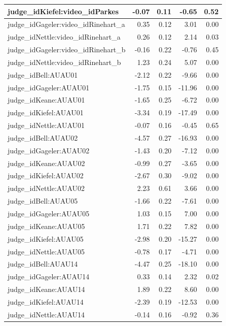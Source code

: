 \documentclass{monashthesis}
\begin{document}
\begin{tabular}{l|r|r|r|r}
\hline
judge\_idKiefel:video\_idParkes & -0.07 & 0.11 & -0.65 & 0.52\\
\hline
judge\_idGageler:video\_idRinehart\_a & 0.35 & 0.12 & 3.01 & 0.00\\
\hline
judge\_idNettle:video\_idRinehart\_a & 0.26 & 0.12 & 2.14 & 0.03\\
\hline
judge\_idGageler:video\_idRinehart\_b & -0.16 & 0.22 & -0.76 & 0.45\\
\hline
judge\_idNettle:video\_idRinehart\_b & 1.23 & 0.24 & 5.07 & 0.00\\
\hline
judge\_idBell:AUAU01 & -2.12 & 0.22 & -9.66 & 0.00\\
\hline
judge\_idGageler:AUAU01 & -1.75 & 0.15 & -11.96 & 0.00\\
\hline
judge\_idKeane:AUAU01 & -1.65 & 0.25 & -6.72 & 0.00\\
\hline
judge\_idKiefel:AUAU01 & -3.34 & 0.19 & -17.49 & 0.00\\
\hline
judge\_idNettle:AUAU01 & -0.07 & 0.16 & -0.45 & 0.65\\
\hline
judge\_idBell:AUAU02 & -4.57 & 0.27 & -16.93 & 0.00\\
\hline
judge\_idGageler:AUAU02 & -1.43 & 0.20 & -7.12 & 0.00\\
\hline
judge\_idKeane:AUAU02 & -0.99 & 0.27 & -3.65 & 0.00\\
\hline
judge\_idKiefel:AUAU02 & -2.67 & 0.30 & -9.02 & 0.00\\
\hline
judge\_idNettle:AUAU02 & 2.23 & 0.61 & 3.66 & 0.00\\
\hline
judge\_idBell:AUAU05 & -1.66 & 0.22 & -7.61 & 0.00\\
\hline
judge\_idGageler:AUAU05 & 1.03 & 0.15 & 7.00 & 0.00\\
\hline
judge\_idKeane:AUAU05 & 1.71 & 0.22 & 7.82 & 0.00\\
\hline
judge\_idKiefel:AUAU05 & -2.98 & 0.20 & -15.27 & 0.00\\
\hline
judge\_idNettle:AUAU05 & -0.78 & 0.17 & -4.71 & 0.00\\
\hline
judge\_idBell:AUAU14 & -4.47 & 0.25 & -18.10 & 0.00\\
\hline
judge\_idGageler:AUAU14 & 0.33 & 0.14 & 2.32 & 0.02\\
\hline
judge\_idKeane:AUAU14 & 1.89 & 0.22 & 8.60 & 0.00\\
\hline
judge\_idKiefel:AUAU14 & -2.39 & 0.19 & -12.53 & 0.00\\
\hline
judge\_idNettle:AUAU14 & -0.14 & 0.16 & -0.92 & 0.36\\
\hline

\end{tabular}
\end{document}
